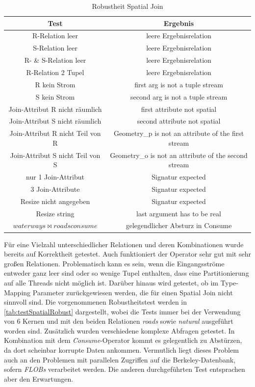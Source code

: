\documentclass[a4paper,12pt,twoside]{article}
\newcommand{\Fb}[1]{\textit{#1}} %
\begin{document}
\begin{table}
	\centering
	\begin{tabular}{|c|c|}
		\hline 
		Test & Ergebnis \\ 
		\hline
		R-Relation leer & leere Ergebnisrelation \\ 
		\hline
		S-Relation leer & leere Ergebnisrelation \\ 
		\hline
		R- \& S-Relation leer & leere Ergebnisrelation \\ 
		\hline
		R-Relation 2 Tupel & leere Ergebnisrelation \\ 
		\hline
		R kein Strom & first arg is not a tuple stream \\ 
		\hline
		S kein Strom & second arg is not a tuple stream \\ 
		\hline
		Join-Attribut R nicht räumlich & first attribute not spatial \\ 
		\hline
		Join-Attribut S nicht räumlich & second attribute not spatial \\ 
		\hline
		Join-Attribut R nicht Teil von R & Geometry\_p is not an attribute of the first stream \\ 
		\hline
		Join-Attribut S nicht Teil von S & Geometry\_o is not an attribute of the second stream \\ 
		\hline
		nur 1 Join-Attribut & Signatur expected \\
		\hline
		3 Join-Attribute &  Signatur expected \\
		\hline
		Resize nicht angegeben & Signatur expected \\ 
		\hline
		Resize string & last argument has to be real \\ 
		\hline
		$waterways \bowtie roads consume$ & gelegendlicher Absturz in Consume \\
		\hline
	\end{tabular}
	\caption{\label{tab:testSpatialRobust}Robustheit Spatial Join}
\end{table}

Für eine Vielzahl unterschiedlicher Relationen und deren Kombinationen wurde bereits auf Korrektheit getestet. Auch funktioniert der Operator sehr gut mit sehr großen Relationen. Problematisch kann es sein, wenn die Eingangsströme entweder ganz leer sind oder so wenige Tupel enthalten, dass eine Partitionierung auf alle Threads nicht möglich ist. Darüber hinaus wird getestet, ob im Type-Mapping Parameter zurückgewiesen werden, die für einen Spatial Join nicht sinnvoll sind. Die vorgenommenen Robustheitstest werden in \autoref{tab:testSpatialRobust} dargestellt, wobei die Tests immer bei der Verwendung von 6 Kernen und mit den beiden Relationen \Fb{roads} sowie \Fb{natural} ausgeführt worden sind. Zusätzlich wurden verschiedene komplexe Abfragen getestet. In Kombination mit dem \Fb{Consume}-Operator kommt es gelegentlich zu Abstürzen, da dort scheinbar korrupte Daten ankommen. Vermutlich liegt dieses Problem auch an den Problemen mit parallelen Zugriffen auf die Berkeley-Datenbank, sofern \Fb{FLOBs} verarbeitet werden. Die anderen durchgeführten Test entsprachen aber den Erwartungen.
\end{document}
